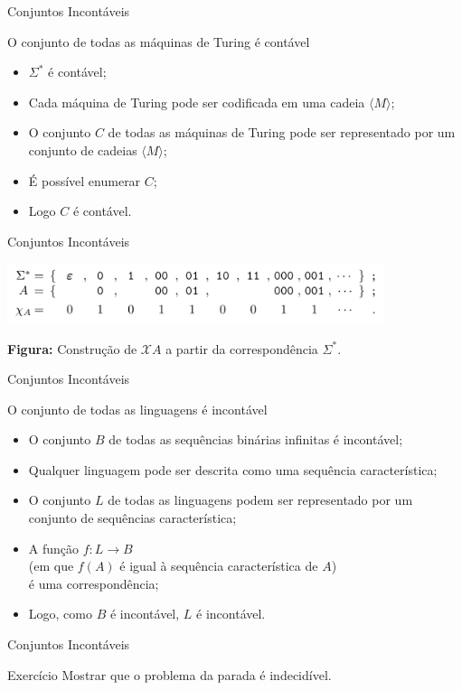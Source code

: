 \documentclass[xcolor=dvipsnames,table]{beamer}
\begin{document}
	\begin{frame}{Conjuntos Incontáveis}
		\begin{block}{O conjunto de todas as máquinas de Turing é contável}
			\begin{itemize}
				\item $\Sigma^*$ é contável; \pause
				\item Cada máquina de Turing pode ser codificada em uma cadeia $\langle M \rangle$; \pause
				\item O conjunto $C$ de todas as máquinas de Turing pode ser representado por um conjunto de cadeias $\langle M \rangle$; \pause
				\item É possível enumerar $C$; \pause
				\item Logo $C$ é contável.
			\end{itemize}
		\end{block}
	\end{frame}
	
	\begin{frame}{Conjuntos Incontáveis}
		\begin{center}
			\includegraphics[width=11cm]{images/seqCar.png}
			
			{\bf Figura:} Construção de $\mathcal{X}A$ a partir da correspondência $\Sigma^*$.
		\end{center}
	\end{frame}
	
	\begin{frame}{Conjuntos Incontáveis}
		\begin{block}{O conjunto de todas as linguagens é incontável}
			\begin{itemize}
				\item O conjunto $B$ de todas as sequências binárias infinitas é incontável; \pause
				\item Qualquer linguagem pode ser descrita como uma sequência característica; \pause
				\item O conjunto $L$ de todas as linguagens podem ser representado por um conjunto de sequências \pause característica; \pause
				\item A função $f : L \rightarrow B$ \\(em que $f(A)$ é igual à sequência característica de $A$) \\é uma correspondência; \pause
				\item Logo, como $B$ é incontável, $L$ é incontável.
			\end{itemize}
		\end{block}
	\end{frame}
	
	\begin{frame}{Conjuntos Incontáveis}
		\begin{block}{Exercício}
			Mostrar que o problema da parada é indecidível.
		\end{block}
	\end{frame}

	\begin{frame}
		\titlepage
	\end{frame}
	
\end{document}
